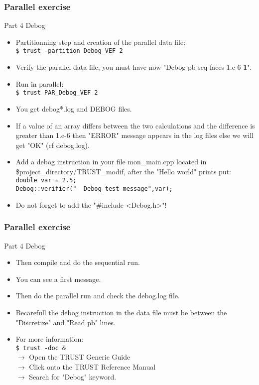\documentclass[10pt, hyperref={unicode=true,pdfusetitle, bookmarks=true,bookmarksnumbered=false,bookmarksopen=false, breaklinks=false,pdfborder={0 0 1},backref=true,colorlinks=true,linkcolor=darkblue,pageanchor, urlcolor=darkblue}]{beamer}
\begin{document}
\begin{frame}
\frametitle{Parallel exercise}
\begin{block}{Part 4 Debog}

\begin{itemize}
\item Partitionning step and creation of the parallel data file:\\
\texttt{\$ trust -partition Debog\_VEF 2 }\\
\item Verify the parallel data file, you must have now "Debog pb seq faces 1.e-6 \textbf{1}".
\item Run in parallel:\\
\texttt{\$ trust PAR\_Debog\_VEF 2 }\\
\item You get debog*.log and DEBOG files.
\item If a value of an array differs between the two calculations and the difference is greater than 1.e-6 then "ERROR" message appears in the log files else we will get "OK" (cf debog.log).\\

\item Add a debog instruction in your file mon\_main.cpp located in \$project\_directory/TRUST\_modif, after the "Hello world" prints put:\\
\texttt{double var = 2.5;}\\
\texttt{Debog::verifier("- Debog test message",var);}

\item Do not forget to add the "\#include <Debog.h>"!
\end{itemize}

\end{block}
\end{frame}
\begin{frame}
\frametitle{Parallel exercise}
\begin{block}{Part 4 Debog}

\begin{itemize}
\item Then compile and do the sequential run.
\item You can see a first message.
\item Then do the parallel run and check the debog.log file.
\item Becarefull the debog instruction in the data file must be between the "Discretize" and "Read pb" lines.
\item For more information:\\
\texttt{\$ trust -doc \&} \\
$\rightarrow$ Open the TRUST Generic Guide\\
$\rightarrow$ Click onto the TRUST Reference Manual\\
$\rightarrow$ Search for "Debog" keyword.
\end{itemize}

\end{block}
\end{frame}
\end{document}
